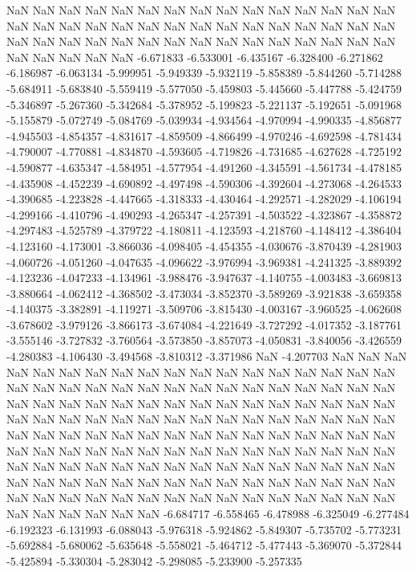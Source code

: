 NaN
NaN
NaN
NaN
NaN
NaN
NaN
NaN
NaN
NaN
NaN
NaN
NaN
NaN
NaN
NaN
NaN
NaN
NaN
NaN
NaN
NaN
NaN
NaN
NaN
NaN
NaN
NaN
NaN
NaN
NaN
NaN
NaN
NaN
NaN
NaN
NaN
NaN
NaN
NaN
NaN
NaN
NaN
NaN
NaN
NaN
NaN
NaN
NaN
NaN
-6.671833
-6.533001
-6.435167
-6.328400
-6.271862
-6.186987
-6.063134
-5.999951
-5.949339
-5.932119
-5.858389
-5.844260
-5.714288
-5.684911
-5.683840
-5.559419
-5.577050
-5.459803
-5.445660
-5.447788
-5.424759
-5.346897
-5.267360
-5.342684
-5.378952
-5.199823
-5.221137
-5.192651
-5.091968
-5.155879
-5.072749
-5.084769
-5.039934
-4.934564
-4.970994
-4.990335
-4.856877
-4.945503
-4.854357
-4.831617
-4.859509
-4.866499
-4.970246
-4.692598
-4.781434
-4.790007
-4.770881
-4.834870
-4.593605
-4.719826
-4.731685
-4.627628
-4.725192
-4.590877
-4.635347
-4.584951
-4.577954
-4.491260
-4.345591
-4.561734
-4.478185
-4.435908
-4.452239
-4.690892
-4.497498
-4.590306
-4.392604
-4.273068
-4.264533
-4.390685
-4.223828
-4.447665
-4.318333
-4.430464
-4.292571
-4.282029
-4.106194
-4.299166
-4.410796
-4.490293
-4.265347
-4.257391
-4.503522
-4.323867
-4.358872
-4.297483
-4.525789
-4.379722
-4.180811
-4.123593
-4.218760
-4.148412
-4.386404
-4.123160
-4.173001
-3.866036
-4.098405
-4.454355
-4.030676
-3.870439
-4.281903
-4.060726
-4.051260
-4.047635
-4.096622
-3.976994
-3.969381
-4.241325
-3.889392
-4.123236
-4.047233
-4.134961
-3.988476
-3.947637
-4.140755
-4.003483
-3.669813
-3.880664
-4.062412
-4.368502
-3.473034
-3.852370
-3.589269
-3.921838
-3.659358
-4.140375
-3.382891
-4.119271
-3.509706
-3.815430
-4.003167
-3.960525
-4.062608
-3.678602
-3.979126
-3.866173
-3.674084
-4.221649
-3.727292
-4.017352
-3.187761
-3.555146
-3.727832
-3.760564
-3.573850
-3.857073
-4.050831
-3.840056
-3.426559
-4.280383
-4.106430
-3.494568
-3.810312
-3.371986
NaN
-4.207703
NaN
NaN
NaN
NaN
NaN
NaN
NaN
NaN
NaN
NaN
NaN
NaN
NaN
NaN
NaN
NaN
NaN
NaN
NaN
NaN
NaN
NaN
NaN
NaN
NaN
NaN
NaN
NaN
NaN
NaN
NaN
NaN
NaN
NaN
NaN
NaN
NaN
NaN
NaN
NaN
NaN
NaN
NaN
NaN
NaN
NaN
NaN
NaN
NaN
NaN
NaN
NaN
NaN
NaN
NaN
NaN
NaN
NaN
NaN
NaN
NaN
NaN
NaN
NaN
NaN
NaN
NaN
NaN
NaN
NaN
NaN
NaN
NaN
NaN
NaN
NaN
NaN
NaN
NaN
NaN
NaN
NaN
NaN
NaN
NaN
NaN
NaN
NaN
NaN
NaN
NaN
NaN
NaN
NaN
NaN
NaN
NaN
NaN
NaN
NaN
NaN
NaN
NaN
NaN
NaN
NaN
NaN
NaN
NaN
NaN
NaN
NaN
NaN
NaN
NaN
NaN
NaN
NaN
NaN
NaN
NaN
NaN
NaN
NaN
NaN
NaN
NaN
NaN
NaN
NaN
NaN
NaN
NaN
NaN
NaN
NaN
NaN
NaN
NaN
NaN
NaN
NaN
NaN
NaN
-6.684717
-6.558465
-6.478988
-6.325049
-6.277484
-6.192323
-6.131993
-6.088043
-5.976318
-5.924862
-5.849307
-5.735702
-5.773231
-5.692884
-5.680062
-5.635648
-5.558021
-5.464712
-5.477443
-5.369070
-5.372844
-5.425894
-5.330304
-5.283042
-5.298085
-5.233900
-5.257335
